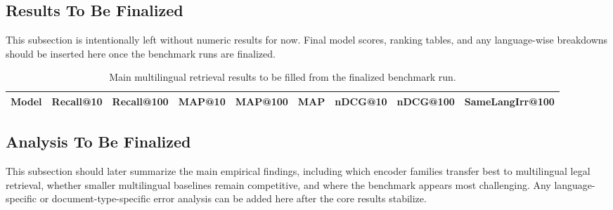 \subsection{Results To Be Finalized}

This subsection is intentionally left without numeric results for now. Final model scores, ranking tables, and any language-wise breakdowns should be inserted here once the benchmark runs are finalized.

\begin{table}[t]
\centering
\caption{Main multilingual retrieval results to be filled from the finalized benchmark run.}
\label{tab:main-results}
\begin{tabular}{lcccccccc}
\toprule
Model & Recall@10 & Recall@100 & MAP@10 & MAP@100 & MAP & nDCG@10 & nDCG@100 & SameLangIrr@100 \\
\midrule
\bottomrule
\end{tabular}
\end{table}

\subsection{Analysis To Be Finalized}

This subsection should later summarize the main empirical findings, including which encoder families transfer best to multilingual legal retrieval, whether smaller multilingual baselines remain competitive, and where the benchmark appears most challenging. Any language-specific or document-type-specific error analysis can be added here after the core results stabilize.
